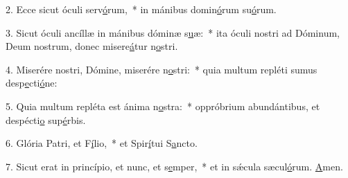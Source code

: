 2. Ecce sicut óculi serv\uline{ó}rum,~* in mánibus domin\uline{ó}rum su\uline{ó}rum.\par 
3. Sicut óculi ancíllæ in mánibus dóminæ s\uline{u}æ:~* ita óculi nostri ad Dóminum, Deum nostrum, donec misere\uline{á}tur n\uline{o}stri.\par 
4. Miserére nostri, Dómine, miserére n\uline{o}stri:~* quia multum repléti sumus desp\uline{e}cti\uline{ó}ne:\par 
5. Quia multum repléta est ánima n\uline{o}stra:~* oppróbrium abundántibus, et despécti\uline{o} sup\uline{é}rbis.\par 
6. Glória Patri, et F\uline{í}lio,~* et Spir\uline{í}tui S\uline{a}ncto.\par 
7. Sicut erat in princípio, et nunc, et s\uline{e}mper,~* et in sǽcula sæcul\uline{ó}rum. \uline{A}men.\par 
